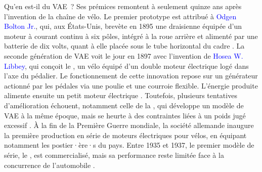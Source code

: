 \begin{refsegment}
Qu’en est-il du \acrfull{VAE}~? Ses prémices remontent à seulement quinze ans après l’invention de la chaîne de vélo. Le premier prototype est attribué à \textcolor{blue}{Odgen Bolton Jr.}, qui, aux États-Unis, brevète en 1895 une draisienne équipée d’un moteur à courant continu à six pôles, intégré à la roue arrière et alimenté par une batterie de dix volts, quant à elle placée sous le tube horizontal du cadre \textcolor{blue}{\autocites[3]{hung_review_2020}{adelski_qui_2023}}. La seconde génération de \acrshort{VAE} voit le jour en 1897 avec l’invention de \textcolor{blue}{Hosea W. Libbey}, qui conçoit le , un vélo équipé d’un double moteur électrique logé dans l’axe du pédalier. Le fonctionnement de cette innovation repose sur un générateur actionné par les pédales via une poulie et une courroie flexible. L’énergie produite alimente ensuite un petit moteur électrique \textcolor{blue}{\autocite[3]{hung_review_2020}}. Toutefois, plusieurs tentatives d’amélioration échouent, notamment celle de la , qui développe un modèle de \acrshort{VAE} à la même époque, mais se heurte à des contraintes liées à un poids jugé excessif \textcolor{blue}{\autocite[78]{hadland_bicycle_2016}}. À la fin de la Première Guerre mondiale, la société allemande  inaugure la première production en série de moteurs électriques pour vélos, en équipant notamment les postier·ère·s du pays. Entre 1935 et 1937, le premier modèle de série, le , est commercialisé, mais sa performance reste limitée face à la concurrence de l’automobile \textcolor{blue}{\autocite[143]{smethurst_bicycle_2015}}.%


\end{refsegment}
